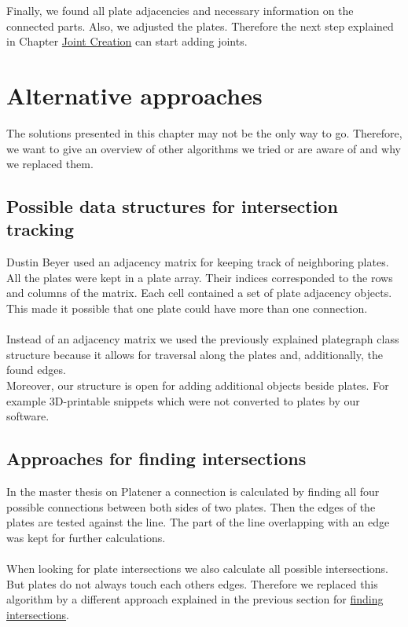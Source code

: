 \documentclass[../ClassicThesis.tex]{subfiles}
\begin{document}
Finally, we found all plate adjacencies and necessary information on the connected parts. Also, we adjusted the plates. Therefore the next step explained in Chapter \hyperref[ch:joints]{Joint Creation} can start adding joints.

\section{Alternative approaches}
The solutions presented in this chapter may not be the only way to go. Therefore, we want to give an overview of other algorithms we tried or are aware of and why we replaced them.

\subsection{Possible data structures for intersection tracking}
Dustin Beyer \citeauthor{master-thesis} used an adjacency matrix for keeping track of neighboring plates. All the plates were kept in a plate array. Their indices corresponded to the rows and columns of the matrix. Each cell contained a set of plate adjacency objects. This made it possible that one plate could have more than one connection.\\
\*\\
Instead of an adjacency matrix we used the previously explained plategraph class structure because it allows for traversal along the plates and, additionally, the found edges. \\
Moreover, our structure is open for adding additional objects beside plates. For example 3D-printable snippets which were not converted to plates by our software.

\subsection{Approaches for finding intersections}
In the master thesis on Platener\cite{master-thesis} a connection is calculated by finding all four possible connections between both sides of two plates. Then the edges of the plates are tested against the line. The part of the line overlapping with an edge was kept for further calculations.\\
\*\\
When looking for plate intersections we also calculate all possible intersections. But plates do not always touch each others edges. Therefore we replaced this algorithm by a different approach explained in the previous section for \hyperref[findIntersections]{finding intersections}.
\end{document}
